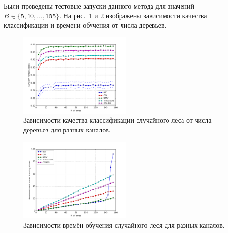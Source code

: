 Были проведены тестовые запуски данного метода для значений \(B\in\{5,10,\dotsc,155\}\). На рис.~\ref{fig:randfor-base-scores} и \ref{fig:randfor-base-times} изображены зависимости качества классификации и времени обучения от числа деревьев.
\begin{figure}[h!]
    \centering
    \includegraphics[width=0.5\textwidth]{images/randfor-scores.png}
    \caption{Зависимости качества классификации случайного леса от числа деревьев для разных каналов.}
    \label{fig:randfor-base-scores}
\end{figure}
\begin{figure}[h!]
    \centering
    \includegraphics[width=0.5\textwidth]{images/randfor-times.png}
    \caption{Зависимости времён обучения случайного леся для разных каналов.}
    \label{fig:randfor-base-times}
\end{figure}

